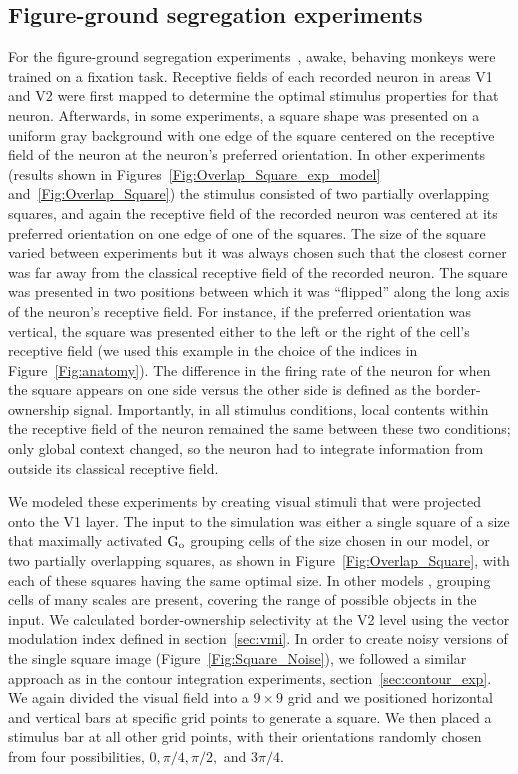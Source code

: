 \subsection{Figure-ground segregation experiments} 
\label{sec:FGO}
For the figure-ground segregation experiments~\citep{Zhou_etal00,
  Qiu_etal07, Zhang_vonderHeydt10}, awake, behaving monkeys were
trained on a fixation task.  Receptive fields of each recorded neuron
in areas V1 and V2 were first mapped to determine the optimal stimulus
properties for that neuron. Afterwards, in some experiments, a square
shape was presented on a uniform gray background with one edge of the
square centered on the receptive field of the neuron at the neuron's
preferred orientation.  In other experiments (results shown in
Figures~\ref{Fig:Overlap_Square_exp_model}
and~\ref{Fig:Overlap_Square}) the stimulus consisted of two partially
overlapping squares, and again the receptive field of the recorded
neuron was centered at its preferred orientation on one edge of one of
the squares.  The size of the square varied between experiments but it
was always chosen such that the closest corner was far away from the
classical receptive field of the recorded neuron. The square was
presented in two positions between which it was ``flipped'' along the
long axis of the neuron's receptive field. For instance, if the
preferred orientation was vertical, the square was presented either to
the left or the right of the cell's receptive field (we used this
example in the choice of the indices in Figure~\ref{Fig:anatomy}).
The difference in the firing rate of the neuron for when the square
appears on one side versus the other side is defined
as the border-ownership signal. Importantly, in all stimulus conditions, local 
contents 
%
within the receptive field of the neuron remained the same between
these two conditions; only global context  
changed, so the neuron had to integrate information from
outside its classical receptive field.

We modeled these experiments by creating visual stimuli that were
projected onto the V1 layer. The input to the simulation was either a
single square of a size that maximally activated $\rm G_o$ grouping
cells of the size chosen in our model, or two partially overlapping
squares, as shown in Figure~\ref{Fig:Overlap_Square}, with each of
these squares having the same optimal size. In other models
\citep{Craft_etal07,Mihalas_etal11b,Russell_etal14}, grouping cells of
many scales are present, covering the range of possible objects in the
input. We calculated border-ownership selectivity at the V2 level
using the vector modulation index defined in section~\ref{sec:vmi}.
In order to create noisy versions of the single square image
(Figure~\ref{Fig:Square_Noise}), we followed a similar approach as in
the contour integration experiments, section~\ref{sec:contour_exp}.
We again divided the visual field into a $9 \times 9$ grid and we
positioned horizontal and vertical bars at specific grid points to
generate a square. We then placed a stimulus bar at all other grid
points, with their orientations randomly chosen from four
possibilities, $0, \pi/4, \pi/2,$ and $3\pi/4$.

